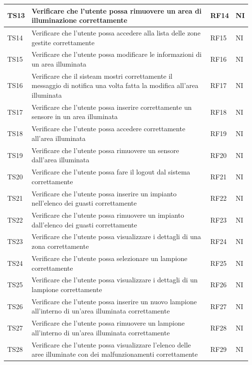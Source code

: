 \documentclass[12pt]{article}
\begin{document}
\begin{xltabular}{\linewidth}{|>{\hsize}X|>{\hsize}X|>{\hsize}X|>{\hsize}X|}
	\hline						
	TS13	 & Verificare che l'utente possa rimuovere un area di illuminazione correttamente	&	RF14	&	NI	\\
	\hline						
	TS14	 & Verificare che l'utente possa accedere alla lista delle zone gestite correttamente	&	RF15	&	NI	\\
	\hline						
	TS15	 & Verificare che l'utente possa modificare le informazioni di un area illuminata	&	RF16	&	NI	\\
	\hline						
	TS16	 & Verificare che il sisteam mostri correttamente il messaggio di notifica una volta fatta la modifica all'area illuminata 	&	RF17	&	NI	\\
	\hline						
	TS17	 & Verificare che l'utente possa inserire correttamente un sensore in un area illuminata	&	RF18	&	NI	\\
	\hline						
	TS18	 & Verificare che l'utente possa accedere correttamente all'area illuminata	&	RF19	&	NI	\\
	\hline						
	TS19	 & Verificare che l'utente possa rimuovere un sensore dall'area illuminata	&	RF20	&	NI	\\
	\hline						
	TS20	 & Verificare che l'utente possa fare il logout dal sistema correttamente	&	RF21	&	NI	\\
	\hline						
	TS21	 & Verificare che l'utente possa inserire un impianto nell'elenco dei guasti correttamente	&	RF22	&	NI	\\
	\hline						
	TS22	 & Verificare che l'utente possa rimuovere un impianto dall'elenco dei guasti correttamente	&	RF23	&	NI	\\
	\hline						
	TS23	 & Verificare che l'utente possa visualizzare i dettagli di una zona correttamente	&	RF24	&	NI	\\
	\hline						
	TS24	 & Verificare che l'utente possa selezionare un lampione correttamente	&	RF25	&	NI	\\
	\hline						
	TS25	 & Verificare che l'utente possa visualizzare i dettagli di un lampione correttamente	&	RF26	&	NI	\\
	\hline						
	TS26	 & Verificare che l'utente possa inserire un nuovo lampione all'interno di un'area illuminata correttamente	&	RF27	&	NI	\\
	\hline						
	TS27	 & Verificare che l'utente possa rimuovere un lampione all'interno di un'area illuminata correttamente	&	RF28	&	NI	\\
	\hline						
	TS28	 & Verificare che l'utente possa visualizzare l'elenco delle aree illuminate con dei malfunzionamenti correttamente	&	RF29	&	NI	\\

\end{xltabular}
\end{document}
